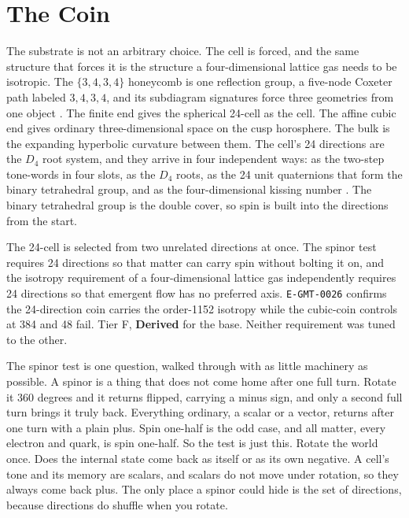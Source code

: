 \section{The Coin}

The substrate is not an arbitrary choice. The cell is forced, and
the same structure that forces it is the structure a four-dimensional lattice gas
needs to be isotropic. The $\{3,4,3,4\}$ honeycomb is one reflection group, a
five-node Coxeter path labeled $3,4,3,4$, and its subdiagram signatures force
three geometries from one object \cite{coxeter1973}. The finite end gives the
spherical 24-cell as the cell. The affine cubic end gives ordinary
three-dimensional space on the cusp horosphere. The bulk is the expanding
hyperbolic curvature between them. The cell's 24 directions are the $D_4$ root
system, and they arrive in four independent ways: as the two-step tone-words in
four slots, as the $D_4$ roots, as the 24 unit quaternions that form the binary
tetrahedral group, and as the four-dimensional kissing number \cite{conway2003}.
The binary tetrahedral group is the double cover, so spin is built into the
directions from the start.

\begin{finding}
The 24-cell is selected from two unrelated directions at once. The spinor test
requires 24 directions so that matter can carry spin without bolting it on, and
the isotropy requirement of a four-dimensional lattice gas independently requires
24 directions so that emergent flow has no preferred axis. \texttt{E-GMT-0026} confirms
the 24-direction coin carries the order-1152 isotropy while the cubic-coin
controls at 384 and 48 fail. Tier F, \textbf{Derived} for the base. Neither
requirement was tuned to the other.
\end{finding}

The spinor test is one question, walked through with as little machinery as
possible. A spinor is a thing that does not come home after one full turn. Rotate
it 360 degrees and it returns flipped, carrying a minus sign, and only a second
full turn brings it truly back. Everything ordinary, a scalar or a vector,
returns after one turn with a plain plus. Spin one-half is the odd case, and all
matter, every electron and quark, is spin one-half. So the test is just this.
Rotate the world once. Does the internal state come back as itself or as its own
negative. A cell's tone and its memory are scalars, and scalars do not move under
rotation, so they always come back plus. The only place a spinor could hide is
the set of directions, because directions do shuffle when you rotate.

